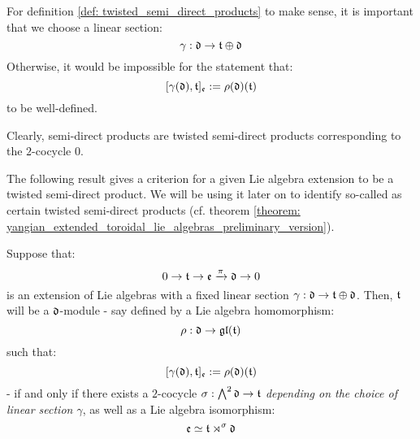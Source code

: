         \begin{remark}
            For definition \ref{def: twisted_semi_direct_products} to make sense, it is important that we choose a linear section:
                $$\gamma: \mathfrak{d} \to \mathfrak{t} \oplus \mathfrak{d}$$
            Otherwise, it would be impossible for the statement that:
                $$[\gamma(\mathfrak{d}), \mathfrak{t}]_{\mathfrak{e}} := \rho(\mathfrak{d})(\mathfrak{t})$$
            to be well-defined.
        \end{remark}
        \begin{example}
            Clearly, semi-direct products are twisted semi-direct products corresponding to the $2$-cocycle $0$.
        \end{example}
        The following result gives a criterion for a given Lie algebra extension to be a twisted semi-direct product. We will be using it later on to identify so-called  as certain twisted semi-direct products (cf. theorem \ref{theorem: yangian_extended_toroidal_lie_algebras_preliminary_version}).
        \begin{proposition} \label{prop: twisted_semi_direct_product_criterion}
            Suppose that:
                $$0 \to \mathfrak{t} \to \mathfrak{e} \xrightarrow[]{\pi} \mathfrak{d} \to 0$$
            is an extension of Lie algebras with a fixed linear section $\gamma: \mathfrak{d} \to \mathfrak{t} \oplus \mathfrak{d}$. Then, $\mathfrak{t}$ will be a $\mathfrak{d}$-module - say defined by a Lie algebra homomorphism:
                $$\rho: \mathfrak{d} \to \mathfrak{gl}(\mathfrak{t})$$
            such that:
                $$[\gamma(\mathfrak{d}), \mathfrak{t}]_{\mathfrak{e}} := \rho(\mathfrak{d})(\mathfrak{t})$$
            - if and only if there exists a $2$-cocycle $\sigma: \bigwedge^2 \mathfrak{d} \to \mathfrak{t}$ \textit{depending on the choice of linear section $\gamma$}, as well as a Lie algebra isomorphism:
                $$\mathfrak{e} \simeq \mathfrak{t} \rtimes^{\sigma} \mathfrak{d}$$
        \end{proposition}
